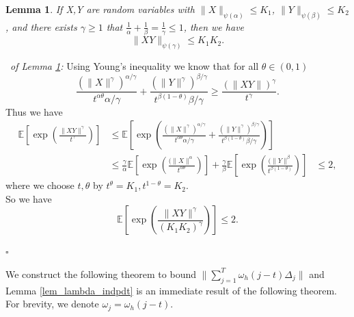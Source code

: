 \documentclass[12pt]{article}
\newtheorem{lemma}{Lemma}
\newenvironment{pf}{{\noindent\it Proof}\ }{\hfill $\square$\par}
\begin{document}
  \begin{lemma}
  \label{lemma_psi_rela}
  If X,Y are random variables with $\|X\|_{\psi(\alpha)}\le K_1$, $\|Y\|_{\psi(\beta)}\le K_2$, and there exists $\gamma \ge 1$ that $\frac{1}{\alpha} + \frac{1}{\beta} = \frac{1}{\gamma}\le 1$, then we have
  \begin{equation}
  \label{psi_rela}
  \|X Y\|_{\psi(\gamma)} \le K_1K_2.
  \end{equation}
  \end{lemma}
\begin{pf}{\it of Lemma \ref{lemma_psi_rela}:}
  Using Young's
  inequality we know that for all $\theta \in (0,1)$
  \begin{equation*}
  \frac{\left(\|X\|^\gamma\right)^{\alpha/\gamma}}{ t^{\alpha \theta} \alpha /\gamma} +  \frac{\left(\|Y\|^\gamma\right)^{\beta/\gamma}}{t^{\beta(1-\theta)}\beta /\gamma} \ge
  \frac{\left(\|X Y\|\right)^{\gamma}}{t^\gamma}.
  \end{equation*}
  Thus we have
  \begin{equation*}
  \begin{aligned}
  \mathbb{E}\left[\exp\left(\frac{\|X Y\|^{\gamma}}{t^\gamma}\right)\right]& \le \mathbb{E}\left[\exp\left( \frac{\left(\|X\|^\gamma\right)^{\alpha/\gamma}}{t^{\alpha\theta}\alpha /\gamma } +  \frac{\left(\|Y\|^\gamma\right)^{\beta/\gamma}}{t^{\beta(1-\theta)}\beta /\gamma } \right)\right]
  \\& \le 
  \frac{\gamma}{\alpha}\mathbb{E}\left[\exp\left(\frac{(\|X\|^\alpha}{t^{\alpha\theta}}\right)\right] +
  \frac{\gamma}{\beta}\mathbb{E}\left[\exp\left(\frac{(\|Y\|^\beta}{t^{\beta (1-\theta)}}\right)\right] &\le 2,
  \end{aligned}
  \end{equation*}
  where we choose $t, \theta$ by $t^{\theta}=K_1,t^{1-\theta}=K_2$.\\
  So we have 
  \begin{equation*}
  \mathbb{E}\left[\exp\left(\frac{\|X Y\|^{\gamma}}{(K_1K_2)^\gamma}\right)\right] \le 2.
  \end{equation*}
  
\end{pf}

  We construct the following theorem to bound $\|\sum_{j=1}^T \omega_h(j-t)\Delta_j\|$ and Lemma \ref{lem_lambda_indpdt} is an immediate result of the following theorem. For brevity, we denote $\omega_j = \omega_h(j-t)$.
\end{document}

